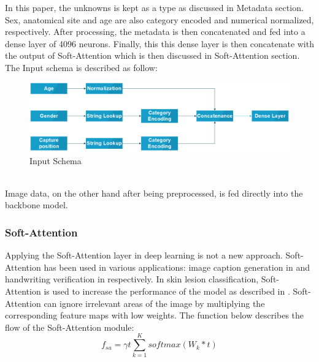 \documentclass[sensors,article,submit,pdftex,moreauthors]{Definitions/mdpi}
\begin{document}
In this paper, the unknowns is kept as a type as discussed in Metadata section. Sex, anatomical site and age are also category encoded and numerical normalized, respectively. After processing, the metadata is then concatenated and fed into a dense layer of 4096 neurons. Finally, this this dense layer is then concatenate with the output of Soft-Attention which is then discussed in Soft-Attention section. The Input schema is described as follow:\\
\begin{figure}[h]
	\centering
	\includegraphics[width=0.7\linewidth]{"Definitions/Input Schema"}
	\caption{Input Schema}
	\label{fig:input-schema}
\end{figure}\\
Image data, on the other hand after being preprocessed, is fed directly into the backbone model. 
\subsubsection{Soft-Attention}
Applying the Soft-Attention layer in deep learning is not a new approach. Soft-Attention has been used in various applications: image caption generation in \cite{03044} and handwriting verification in \cite{202017} respectively. In skin lesion classification, Soft-Attention is used to increase the performance of the model as described in \cite{03358}. Soft-Attention can ignore irrelevant areas of the image by multiplying the corresponding feature maps with low weights. The function below describes the flow of the Soft-Attention module:
\[
f_{sa} = \gamma t\sum_{k=1}^{K}softmax(W_k * t)
\]
\end{document}
